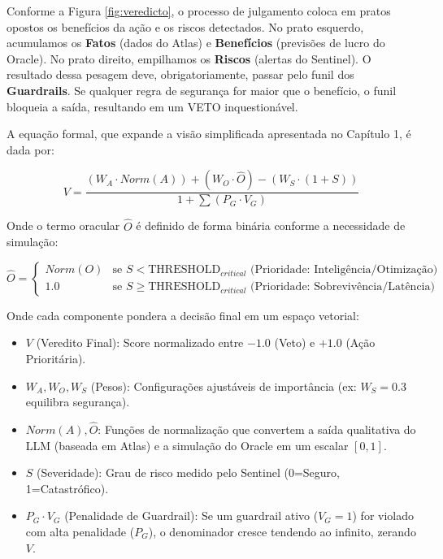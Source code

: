\documentclass[12pt, a4paper]{article}
\begin{document}
Conforme a Figura \ref{fig:veredicto}, o processo de julgamento coloca em pratos opostos os benefícios da ação e os riscos detectados.
No prato esquerdo, acumulamos os \textbf{Fatos} (dados do Atlas) e \textbf{Benefícios} (previsões de lucro do Oracle). No prato direito, empilhamos os \textbf{Riscos} (alertas do Sentinel).
O resultado dessa pesagem deve, obrigatoriamente, passar pelo funil dos \textbf{Guardrails}. Se qualquer regra de segurança for maior que o benefício, o funil bloqueia a saída, resultando em um VETO inquestionável.

A equação formal, que expande a visão simplificada apresentada no Capítulo 1, é dada por:

\begin{equation}
V = \frac{(W_A \cdot Norm(A)) + (W_O \cdot \hat{O}) - (W_S \cdot (1 + S))}{1 + \sum (P_G \cdot V_G)}
\end{equation}

Onde o termo oracular $\hat{O}$ é definido de forma binária conforme a necessidade de simulação:

\begin{equation}
\hat{O} = 
\begin{cases} 
Norm(O) & \text{se } S < \text{THRESHOLD}_{critical} \text{ (Prioridade: Inteligência/Otimização)} \\
1.0 & \text{se } S \geq \text{THRESHOLD}_{critical} \text{ (Prioridade: Sobrevivência/Latência)}
\end{cases}
\end{equation}

Onde cada componente pondera a decisão final em um espaço vetorial:

\begin{itemize}
    \item \textbf{$V$} (Veredito Final): Score normalizado entre $-1.0$ (Veto) e $+1.0$ (Ação Prioritária).
    \item \textbf{$W_A, W_O, W_S$} (Pesos): Configurações ajustáveis de importância (ex: $W_S=0.3$ equilibra segurança).
    \item \textbf{$Norm(A), \hat{O}$}: Funções de normalização que convertem a saída qualitativa do LLM (baseada em Atlas) e a simulação do Oracle em um escalar $[0, 1]$.
    \item \textbf{$S$} (Severidade): Grau de risco medido pelo Sentinel (0=Seguro, 1=Catastrófico).
    \item \textbf{$P_G \cdot V_G$} (Penalidade de Guardrail): Se um guardrail ativo ($V_G=1$) for violado com alta penalidade ($P_G$), o denominador cresce tendendo ao infinito, zerando $V$.
\end{itemize}
\end{document}
